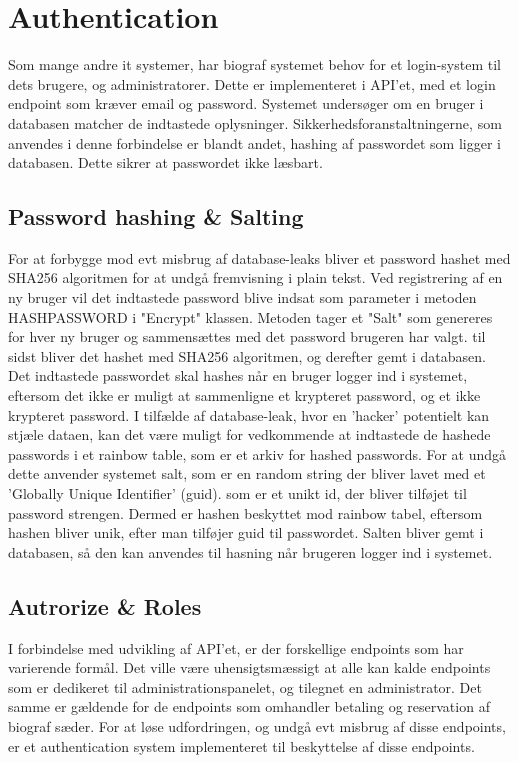 ﻿\section{Authentication}\label{sec:auth}
Som mange andre it systemer, har biograf systemet behov for et login-system til dets brugere, og administratorer.
Dette er implementeret i API'et, med et login endpoint som kræver email og password. 
Systemet undersøger om en bruger i databasen matcher de indtastede oplysninger.
Sikkerhedsforanstaltningerne, som anvendes i denne forbindelse er blandt andet, 
hashing af passwordet som ligger i databasen. Dette sikrer at passwordet ikke læsbart.\\

\subsection{Password hashing \& Salting}
For at forbygge mod evt misbrug af database-leaks bliver et password hashet med SHA256 algoritmen for at undgå fremvisning 
i plain tekst. Ved registrering af en ny bruger vil det indtastede 
password blive indsat som parameter i metoden HASHPASSWORD i "Encrypt" klassen. 
Metoden tager et "Salt" som genereres for hver ny bruger og sammensættes med det password brugeren har valgt. 
til sidst bliver det hashet med SHA256 algoritmen, og derefter gemt i databasen. 
Det indtastede passwordet skal hashes når en bruger logger ind i systemet, eftersom det ikke er muligt at sammenligne et krypteret password, og et ikke krypteret password.
I tilfælde af database-leak, hvor en 'hacker' potentielt kan stjæle dataen, kan det være muligt for vedkommende at indtastede
de hashede passwords i et rainbow table, som er et arkiv for hashed passwords.
For at undgå dette anvender systemet salt, som er en random string der bliver lavet med et 'Globally Unique Identifier' (guid).
som er et unikt id, der bliver tilføjet til password strengen. Dermed er hashen beskyttet mod rainbow tabel, eftersom hashen 
bliver unik, efter man tilføjer guid til passwordet. Salten bliver gemt i databasen, så den kan anvendes til hasning
når brugeren logger ind i systemet.\\

\subsection{Autrorize \& Roles}
I forbindelse med udvikling af API'et, er der forskellige endpoints som har varierende formål. Det ville være
uhensigtsmæssigt at alle kan kalde endpoints som er dedikeret til administrationspanelet, og tilegnet 
en administrator. Det samme er gældende for de endpoints som omhandler betaling og
reservation af biograf sæder. For at løse udfordringen, og undgå evt misbrug af disse 
endpoints, er et authentication system implementeret til beskyttelse af disse endpoints.

